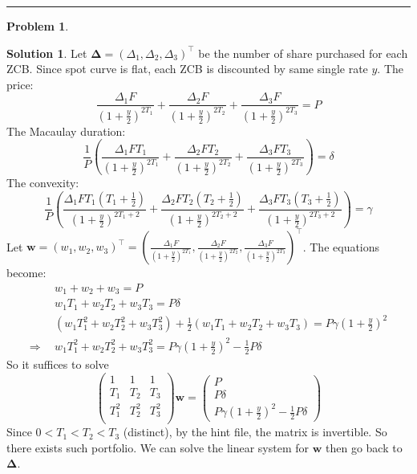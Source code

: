 \documentclass[a4paper, 10pt]{article}
\theoremstyle{definition}
\newtheorem{problem}{Problem}
\theoremstyle{hSol}
\newtheorem*{solution}{Solution}
\begin{document}
\noindent\rule{16cm}{0.4pt}
\begin{problem}
\end{problem}
\begin{solution} Let $\bm{\Delta}=(\Delta_1, \Delta_2, \Delta_3)^{\top}$ be the number of share purchased for each ZCB. Since spot curve is flat, each ZCB is discounted by same single rate $y$. The price:
\begin{equation}
  \frac{\Delta_1 F}{(1+\tfrac{y}{2})^{2T_1}} + \frac{\Delta_2 F}{(1+\tfrac{y}{2})^{2T_2}} + \frac{\Delta_3 F}{(1+\tfrac{y}{2})^{2T_3}} = P
\end{equation}
The Macaulay duration:
\begin{equation}
  \frac{1}{P}\left(\frac{\Delta_1 FT_1}{(1+\tfrac{y}{2})^{2T_1}} + \frac{\Delta_2 FT_2}{(1+\tfrac{y}{2})^{2T_2}} + \frac{\Delta_3 FT_3}{(1+\tfrac{y}{2})^{2T_3}}\right) = \delta
\end{equation}  
The convexity:
\begin{equation}
  \frac{1}{P}\left(\frac{\Delta_1 FT_1(T_1+\frac{1}{2})}{(1+\tfrac{y}{2})^{2T_1+2}} + \frac{\Delta_2 FT_2(T_2+\frac{1}{2})}{(1+\tfrac{y}{2})^{2T_2+2}} + \frac{\Delta_3 FT_3(T_3+\frac{1}{2})}{(1+\tfrac{y}{2})^{2T_3+2}}\right) = \gamma
\end{equation}
Let $\bm{w}= (w_1, w_2, w_3)^{\top} = (\frac{\Delta_1 F}{(1+\tfrac{y}{2})^{2T_1}}, \frac{\Delta_2 F}{(1+\tfrac{y}{2})^{2T_2}}, \frac{\Delta_3 F}{(1+\tfrac{y}{2})^{2T_3}})^{\top}$. The equations become:
\begin{equation}
  \begin{split}
    &w_1 + w_2 + w_3 = P\\
    &w_1T_1 + w_2T_2 + w_3T_3 = P\delta\\
    &(w_1T_1^2 + w_2T_2^2 + w_3T_3^2)+\frac{1}{2}(w_1T_1 + w_2T_2 + w_3T_3) = P\gamma(1+\tfrac{y}{2})^{2}\\
    \Rightarrow~~&w_1T_1^2 + w_2T_2^2 + w_3T_3^2 = P\gamma(1+\tfrac{y}{2})^{2} - \tfrac{1}{2}P\delta
  \end{split}
\end{equation}
So it suffices to solve
\begin{equation}
  \begin{pmatrix}
    1 & 1 & 1\\
    T_1 & T_2 & T_3\\
    T_1^2 & T_2^2 & T_3^2\\
  \end{pmatrix}\bm{w} = \begin{pmatrix}
    P \\
    P\delta\\
    P\gamma(1+\tfrac{y}{2})^{2} - \tfrac{1}{2}P\delta
  \end{pmatrix}
\end{equation}
Since $0<T_1 <T_2<T_3$ (distinct), by the hint file, the matrix is invertible. So there exists such portfolio. We can solve the linear system for $\bm{w}$ then go back to $\bm{\Delta}$.
\end{solution}
\end{document}
